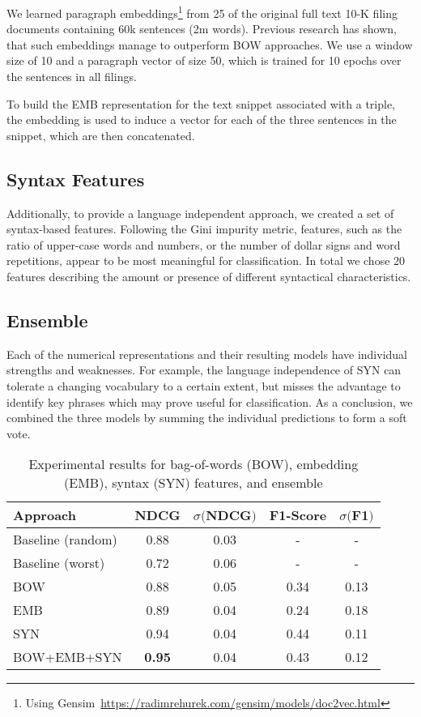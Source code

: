 We learned paragraph embeddings\footnote{Using Gensim~\url{https://radimrehurek.com/gensim/models/doc2vec.html}} from 25 of the original full text 10-K filing documents containing 60k sentences (2m words).
Previous research has shown, that such embeddings manage to outperform BOW approaches\cite{embeddings}.
We use a window size of 10 and a paragraph vector of size 50, which is trained for 10 epochs over the sentences in all filings.

To build the EMB representation for the text snippet associated with a triple, the embedding is used to induce a vector for each of the three sentences in the snippet, which are then concatenated.

\subsection{Syntax Features}
Additionally, to provide a language independent approach, we created a set of syntax-based features.
Following the Gini impurity metric, features, such as the ratio of upper-case words and numbers, or the number of dollar signs and word repetitions, appear to be most meaningful for classification.
In total we chose 20 features describing the amount or presence of different syntactical characteristics.


\subsection{Ensemble}
Each of the numerical representations and their resulting models have individual strengths and weaknesses.
For example, the language independence of SYN can tolerate a changing vocabulary to a certain extent, but misses the advantage to identify key phrases which may prove useful for classification.
As a conclusion, we combined the three models by summing the individual predictions to form a soft vote.

\begin{table}[tb]
	\caption{Experimental results for bag-of-words (BOW), embedding (EMB), syntax (SYN) features, and ensemble}
	\label{tab:results}
	\begin{tabular}{lcccc}
		\toprule
		Approach & NDCG & $\sigma ($NDCG$)$ & F1-Score &  $\sigma ($F1$)$\\
		\midrule
		Baseline (random) & 0.88 & 0.03 & - & - \\
		Baseline (worst)  & 0.72 & 0.06 & - & - \\
		\midrule
		BOW & 0.88 & 0.05 & 0.34 & 0.13\\
		EMB & 0.89 & 0.04 & 0.24 & 0.18\\
		SYN & 0.94 & 0.04 & 0.44 & 0.11 \\
		BOW+EMB+SYN& \textbf{0.95} & 0.04 & 0.43 & 0.12\\
		\bottomrule
	\end{tabular}
\end{table}
